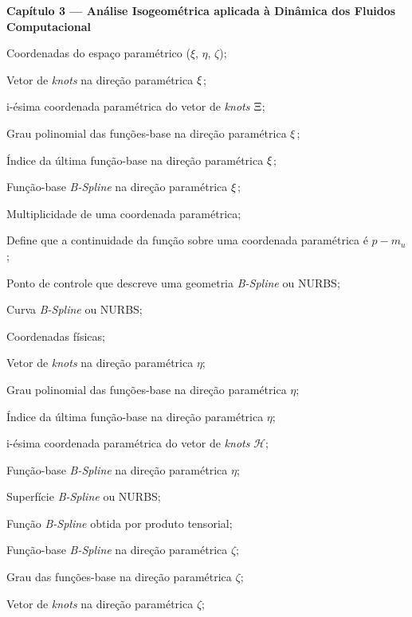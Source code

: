 \begin{simbolos}
\vspace{0.5cm}
\item[]\textbf{Capítulo 3 — Análise Isogeométrica aplicada à Dinâmica dos Fluidos Computacional}
   \item[$\coordAdimen$] Coordenadas do espaço paramétrico (${\xi}$, ${\eta}$, ${\zeta}$);
  \item[$\Xsi$] Vetor de \textit{knots} na direção paramétrica $\xi$;
  \item[$\xsi_i$] i-ésima coordenada paramétrica do vetor de \textit{knots} $\Xsi$;
  \item[$p$] Grau polinomial das funções-base na direção paramétrica $\xi$;
  \item[$n$] Índice da última função-base na direção paramétrica $\xi$;
  \item[$\Nb$] Função-base \textit {B-Spline} na direção paramétrica $\xi$;
  \item[$m_u$] Multiplicidade de uma coordenada paramétrica;
  \item[$C^{p-m_u}$] Define que a continuidade da função sobre uma coordenada paramétrica é $p-m_u$;
   \item[$\CP$] Ponto de controle que descreve uma geometria \textit{B-Spline} ou NURBS;
  \item[$\mathbf{C}$] Curva \textit {B-Spline} ou NURBS;
  \item[$\pos$] Coordenadas físicas;
  \item[$\mathcal{H}$] Vetor de \textit{knots} na direção paramétrica $\eta$;
  \item[$q$] Grau polinomial das funções-base na direção paramétrica $\eta$;
  \item[$m$] Índice da última função-base na direção paramétrica $\eta$;
  \item[$\eta_i$] i-ésima coordenada paramétrica do vetor de \textit{knots} $\mathcal{H}$;
  \item[$\Mb$] Função-base \textit {B-Spline} na direção paramétrica $\eta$;
  \item[$\mathbf{S}$] Superfície \textit {B-Spline} ou NURBS;
  \item[$\hat{\Nb}$] Função \textit {B-Spline} obtida por produto tensorial;
  \item[$\Lb$] Função-base \textit {B-Spline} na direção paramétrica $\zeta$;
  \item[$r$] Grau das funções-base na direção paramétrica $\zeta$;
  \item[$\mathcal{Z}$] Vetor de \textit{knots} na direção paramétrica $\zeta$;

\end{simbolos}
